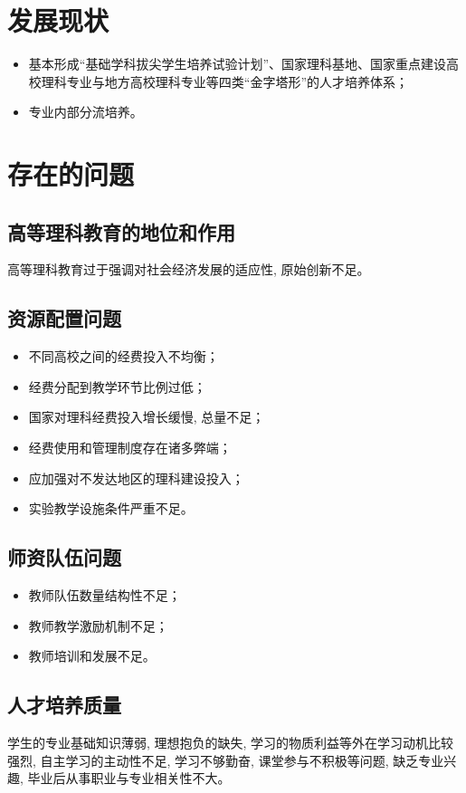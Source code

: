 \documentclass{ctexart}
\begin{document}
\section{发展现状}
\begin{itemize}
	\item 基本形成“基础学科拔尖学生培养试验计划”、国家理科基地、国家重点建设高校理科专业与地方高校理科专业等四类“金字塔形”的人才培养体系；
	\item 专业内部分流培养。
\end{itemize}


\section{存在的问题}
\subsection{高等理科教育的地位和作用}
高等理科教育过于强调对社会经济发展的适应性, 原始创新不足。
\subsection{资源配置问题}
\begin{itemize}
	\item 不同高校之间的经费投入不均衡；
	\item 经费分配到教学环节比例过低；
	\item 国家对理科经费投入增长缓慢, 总量不足；
	\item 经费使用和管理制度存在诸多弊端；
	\item 应加强对不发达地区的理科建设投入；
	\item 实验教学设施条件严重不足。
\end{itemize}
\subsection{师资队伍问题}
\begin{itemize}
	\item 教师队伍数量结构性不足；
	\item 教师教学激励机制不足；
	\item 教师培训和发展不足。
\end{itemize}
\subsection{人才培养质量}
学生的专业基础知识薄弱, 理想抱负的缺失, 学习的物质利益等外在学习动机比较强烈, 自主学习的主动性不足, 学习不够勤奋, 课堂参与不积极等问题, 缺乏专业兴趣, 毕业后从事职业与专业相关性不大。
\end{document}
